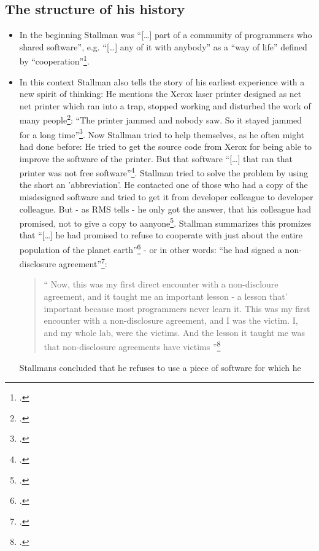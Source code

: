 \documentclass[DIV=calc,BCOR=5mm,11pt,headings=small,oneside,abstract=true, toc=bib]{scrartcl}
\begin{document}
\subsection{The structure of his history}

\begin{itemize}
  \item In the beginning Stallman was \enquote{[\ldots] part of a community
  of programmers who shared software}, e.g. \enquote{[\ldots] any of
  it with anybody} as a \enquote{way of life} defined by
  \enquote{cooperation}\footcite[cf][157]{Stallman2001a}.
  \item In this context Stallman also tells the story of his earliest experience
  with a new spirit of thinking: He mentions the Xerox laser printer
  designed as net net printer which ran into a trap, stopped working and
  disturbed the work of many people\footcite[cf][157]{Stallman2001a}:
  \enquote{The printer jammed and nobody saw. So it stayed jammed for a
  long time}\footcite[][157]{Stallman2001a}. Now Stallman tried to help
  themselves, as he often might had done before: He tried to get the source code
  from Xerox for being able to improve the software of the printer. But that
  software \enquote{[\ldots] that ran that printer was not free
  software}\footcite[][158]{Stallman2001a}. Stallman tried to solve the
  problem by using the short an 'abbreviation'. He contacted one of those who
  had a copy of the misdesigned software and tried to get it from developer
  colleague to developer colleague. But - as RMS tells - he only got the answer,
  that his colleague had promised, not to give a copy to
  aanyone\footcite[cf][158]{Stallman2001a}. Stallman summarizes this promizes
  that \enquote{[\ldots] he had promised to refuse to cooperate with just about
  the entire population of the planet
  earth}\footcite[cf][158]{Stallman2001a} - or in other words: \enquote{he
  had signed a non-disclosure agreement}\footcite[][158]{Stallman2001a}:
  \begin{quote}
  \enquote{ Now, this was my first direct encounter with a non-discloure agreement,
  and it taught me an important lesson - a lesson that' important because most
  programmers never learn it. This was my first encounter with a non-disclosure
  agreement, and I was the victim. I, and my whole lab, were the victims. And the
  lesson it taught me was that non-disclosure agreements have victims
  }\footcite[][158]{Stallman2001a}
  \end{quote}
  Stallmans concluded that he refuses to use a piece of software for which he

\end{itemize}
\end{document}
